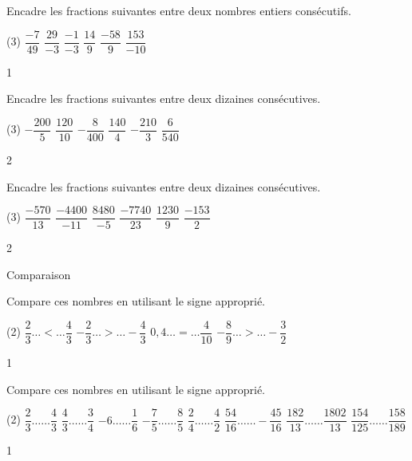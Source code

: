 \documentclass[a4paper,11pt]{report}
\begin{document}
\begin{exo}{
Encadre les fractions suivantes entre deux nombres entiers consécutifs.
	\begin{tasks}(3)
\task $\dfrac{-7}{49}$
\task $\dfrac{29}{-3}$
\task $\dfrac{-1}{-3}$
\task $\dfrac{14}{9}$
\task $\dfrac{-58}{9}$
\task $\dfrac{153}{-10}$
\end{tasks}
 \vspace{1pt}
}{1}\end{exo}


\begin{exo}{
Encadre les fractions suivantes entre deux dizaines consécutives.
	\begin{tasks}(3)
\task $-\dfrac{200}{5}$
\task $\dfrac{120}{10}$
\task $-\dfrac{8}{400}$
\task $\dfrac{140}{4}$
\task $-\dfrac{210}{3}$
\task $\dfrac{6}{540}$
\end{tasks}
 \vspace{1pt}
}{2}\end{exo}

\begin{exo}{
Encadre les fractions suivantes entre deux dizaines consécutives.
	\begin{tasks}(3)
\task $\dfrac{-570}{13}$
\task $\dfrac{-4400}{-11}$
\task $\dfrac{8480}{-5}$
\task $\dfrac{-7740}{23}$
\task $\dfrac{1230}{9}$
\task $\dfrac{-153}{2}$
\end{tasks}
 \vspace{1pt}
}{2}\end{exo}


\begin{resolu}{Comparaison}{ Compare ces nombres en utilisant le signe approprié. 
\begin{tasks}(2)
	\task
	$\dfrac{2}{3} \ldots < \ldots \dfrac{4}{3}$ 
    \task 
  $-\dfrac{2}{3} \ldots > \ldots -\dfrac{4}{3}$
\task $0,4 \ldots=\ldots \dfrac{4}{10}$
\task  $-\dfrac{8}{9}\ldots>\ldots-\dfrac{3}{2}$ 
\end{tasks}
}{1}
\end{resolu}


\begin{exop}{
Compare ces nombres en utilisant le signe approprié. 
\begin{tasks}(2)
	\task $\dfrac{2}{3}\ldots \ldots \dfrac{4}{3} $
	\task $\dfrac{4}{3}\ldots \ldots \dfrac{3}{4} $
    \task $-6\ldots \ldots \dfrac{1}{6} $
	\task $-\dfrac{7}{5}\ldots \ldots \dfrac{8}{5} $
	\task $\dfrac{2}{4}\ldots \ldots \dfrac{4}{2} $
    \task $\dfrac{54}{16}\ldots \ldots -\dfrac{45}{16} $
	\task $\dfrac{182}{13}\ldots \ldots \dfrac{1802}{13} $
 \task $\dfrac{154}{125}\ldots \ldots \dfrac{158}{189} $
\end{tasks}
}{1}
\end{exop}
\end{document}
